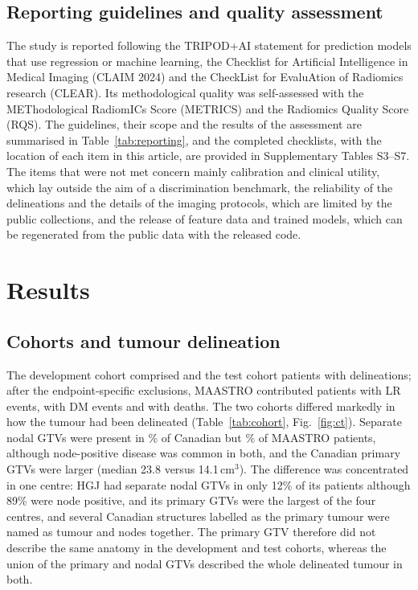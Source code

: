 \documentclass[11pt,a4paper]{article}
\begin{document}
\subsection{Reporting guidelines and quality assessment}\label{sec:reporting}
The study is reported following the TRIPOD+AI statement for prediction models that use regression or machine learning\cite{collins2024tripodai}, the Checklist for Artificial Intelligence in Medical Imaging (CLAIM 2024)\cite{tejani2024claim} and the CheckList for EvaluAtion of Radiomics research (CLEAR)\cite{kocak2023clear}. Its methodological quality was self-assessed with the METhodological RadiomICs Score (METRICS)\cite{kocak2024metrics} and the Radiomics Quality Score (RQS)\cite{lambin2017rqs}. The guidelines, their scope and the results of the assessment are summarised in Table~\ref{tab:reporting}, and the completed checklists, with the location of each item in this article, are provided in Supplementary Tables S3--S7. The items that were not met concern mainly calibration and clinical utility, which lay outside the aim of a discrimination benchmark, the reliability of the delineations and the details of the imaging protocols, which are limited by the public collections, and the release of feature data and trained models, which can be regenerated from the public data with the released code.



\section{Results}\label{sec:results}

\subsection{Cohorts and tumour delineation}
The development cohort comprised \nPatCan{} and the test cohort \nPatMAA{} patients with delineations; after the endpoint-specific exclusions, MAASTRO contributed \nTestLR{} patients with \eTestLR{} LR events, \nTestDM{} with \eTestDM{} DM events and \nTestOS{} with \eTestOS{} deaths. The two cohorts differed markedly in how the tumour had been delineated (Table~\ref{tab:cohort}, Fig.~\ref{fig:ct}). Separate nodal GTVs were present in \nodalPctCan\% of Canadian but \nodalPctMAA\% of MAASTRO patients, although node-positive disease was common in both, and the Canadian primary GTVs were larger (median 23.8 versus 14.1\,cm$^3$). The difference was concentrated in one centre: HGJ had separate nodal GTVs in only 12\% of its patients although 89\% were node positive, and its primary GTVs were the largest of the four centres, and several Canadian structures labelled as the primary tumour were named as tumour and nodes together. The primary GTV therefore did not describe the same anatomy in the development and test cohorts, whereas the union of the primary and nodal GTVs described the whole delineated tumour in both.
\end{document}
